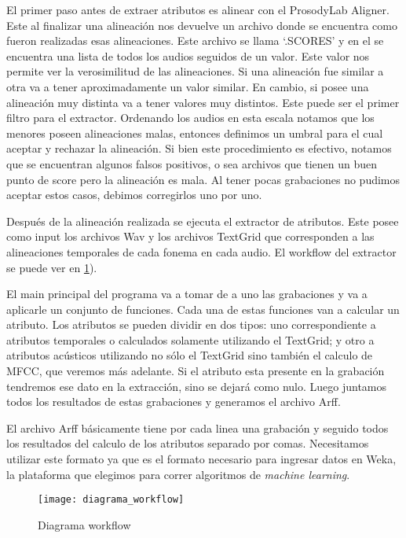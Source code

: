El primer paso antes de extraer atributos es alinear con el ProsodyLab Aligner. Este al finalizar una alineación nos devuelve un archivo donde se encuentra como fueron realizadas esas alineaciones. Este archivo se llama `.SCORES’ y en el se encuentra una lista de todos los audios seguidos de un valor. Este valor nos permite ver la verosimilitud de las alineaciones. Si una alineación fue similar a otra va a tener aproximadamente un valor similar. En cambio, si posee una alineación muy distinta va a tener valores muy distintos. Este puede ser el primer filtro para el extractor. Ordenando los audios en esta escala notamos que los menores poseen alineaciones malas, entonces definimos un umbral para el cual aceptar y rechazar la alineación. Si bien este procedimiento es efectivo, notamos que se encuentran algunos falsos positivos, o sea archivos que tienen un buen punto de score pero la alineación es mala. Al tener pocas grabaciones no pudimos aceptar estos casos, debimos corregirlos uno por uno.

Después de la alineación realizada se ejecuta el extractor de atributos. Este posee como input los archivos Wav y los archivos TextGrid que corresponden a las alineaciones temporales de cada fonema en cada audio. El workflow del extractor se puede ver en \ref{workflow}). 

El main principal del programa va a tomar de a uno las grabaciones y va a aplicarle un conjunto de funciones. Cada una de estas funciones van a calcular un atributo. Los atributos se pueden dividir en dos tipos: uno correspondiente a atributos temporales o calculados solamente utilizando el TextGrid; y otro a atributos acústicos utilizando no sólo el TextGrid sino también el calculo de MFCC, que veremos más adelante. Si el atributo esta presente en la grabación tendremos ese dato en la extracción, sino se dejará como nulo. Luego juntamos todos los resultados de estas grabaciones y generamos el archivo Arff. 

El archivo Arff básicamente tiene por cada linea una grabación y seguido todos los resultados del calculo de los atributos separado por comas. Necesitamos utilizar este formato ya que es el formato necesario para ingresar datos en Weka, la plataforma que elegimos para correr algoritmos de \textit{machine learning}.

\begin{figure}[h!]
    \centerline{\texttt{[image: diagrama\_workflow]} }
    \caption{Diagrama workflow}
    \label{workflow}
\end{figure}

